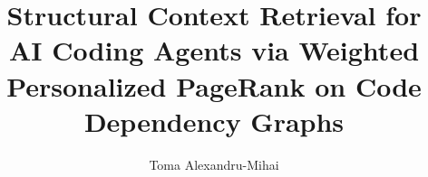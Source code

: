 \documentclass[12pt]{report}
\begin{document}
\title{Structural Context Retrieval for AI Coding Agents via Weighted Personalized PageRank on Code Dependency Graphs}
\author{Toma Alexandru-Mihai}

\hypersetup{pageanchor=false}
\maketitle
\hypersetup{pageanchor=true}

\cleardoublepage
{}

\tableofcontents

\newpage
{}












\end{document}
